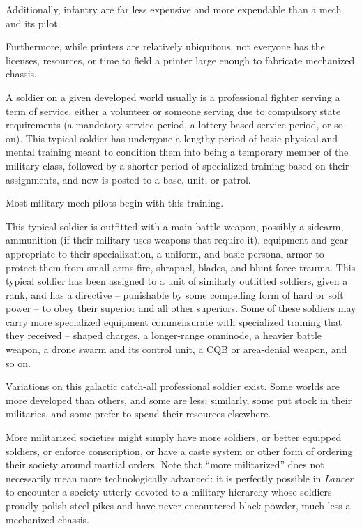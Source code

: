 Additionally, infantry are far less expensive and more expendable than a mech and its pilot.

Furthermore, while printers are relatively ubiquitous, not everyone has the licenses, resources, or
time to field a printer large enough to fabricate mechanized chassis.

A soldier on a given developed world usually is a professional fighter serving a term of service,
either a volunteer or someone serving due to compulsory state requirements (a mandatory
service period, a lottery-based service period, or so on). This typical soldier has undergone a
lengthy period of basic physical and mental training meant to condition them into being a
temporary member of the military class, followed by a shorter period of specialized training
based on their assignments, and now is posted to a base, unit, or patrol.

Most military mech pilots begin with this training.

This typical soldier is outfitted with a main battle weapon, possibly a sidearm, ammunition (if their
military uses weapons that require it), equipment and gear appropriate to their specialization, a
uniform, and basic personal armor to protect them from small arms fire, shrapnel, blades, and
blunt force trauma. This typical soldier has been assigned to a unit of similarly outfitted soldiers,
given a rank, and has a directive -- punishable by some compelling form of hard or soft power --
to obey their superior and all other superiors. Some of these soldiers may carry more specialized
equipment commensurate with specialized training that they received -- shaped charges, a
longer-range omninode, a heavier battle weapon, a drone swarm and its control unit, a CQB or
area-denial weapon, and so on.

Variations on this galactic catch-all professional soldier exist. Some worlds are more developed
than others, and some are less; similarly, some put stock in their militaries, and some prefer to
spend their resources elsewhere.

More militarized societies might simply have more soldiers, or better equipped soldiers, or
enforce conscription, or have a caste system or other form of ordering their society around
martial orders. Note that “more militarized” does not necessarily mean more technologically
advanced: it is perfectly possible in \textit{Lancer} to encounter a society utterly devoted to a military
hierarchy whose soldiers proudly polish steel pikes and have never encountered black powder,
much less a mechanized chassis.

